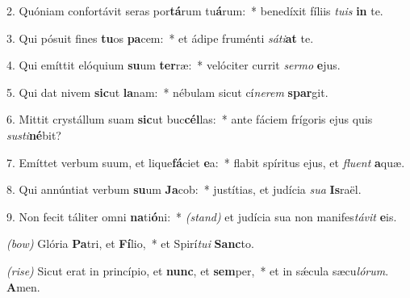 2. Quóniam confortávit seras por\textbf{tá}\-rum tu\textbf{á}rum:~*
	benedíxit fíliis \textit{tu}\textit{is} \textbf{in} te.

3. Qui pósuit fines \textbf{tu}os \textbf{pa}cem:~*
	et ádipe fruménti \textit{sá}\textit{ti}\textbf{at} te.

4. Qui emíttit elóquium \textbf{su}um \textbf{ter}ræ:~*
	velóciter currit \textit{ser}\textit{mo} \textbf{e}jus.

5. Qui dat nivem \textbf{sic}ut \textbf{la}nam:~*
	nébulam sicut cí\textit{ne}\textit{rem} \textbf{spar}git.

6. Mittit crystállum suam \textbf{sic}ut buc\textbf{cél}las:~*
	ante fáciem frígoris ejus quis \textit{sus}\textit{ti}\textbf{né}bit?

7. Emíttet verbum suum, et lique\textbf{fá}ciet \textbf{e}a:~*
	flabit spíritus ejus, et \textit{flu}\textit{ent} \textbf{a}quæ.

8. Qui annúntiat verbum \textbf{su}um \textbf{Ja}cob:~*
	justítias, et judícia \textit{su}\textit{a} \textbf{Is}raël.

9. Non fecit táliter omni \textbf{na}ti\textbf{ó}ni:~* {\color{red}\textit{(stand)}}
	et judícia sua non manifes\textit{tá}\textit{vit} \textbf{e}is.

{\color{red}\textit{(bow)}} Glória \textbf{Pa}tri, et \textbf{Fí}lio,~*
	et Spirí\textit{tu}\textit{i} \textbf{Sanc}to.

{\color{red}\textit{(rise)}} Sicut erat in princípio, et \textbf{nunc}, et \textbf{sem}per,~*
	et in s\'{\ae}cula sæcu\textit{ló}\textit{rum}. \textbf{A}men.